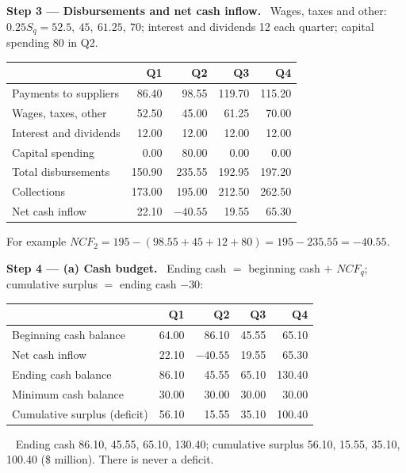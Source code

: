 \documentclass[11pt,a4paper]{article}
\newcommand{\step}[2]{\par\medskip\noindent\textbf{Step #1 --- #2.}~}
\newcommand{\answer}[1]{\par\smallskip\noindent\fbox{\textbf{Answer #1.}}~}
\begin{document}
\step{3}{Disbursements and net cash inflow}
Wages, taxes and other: $0.25 S_q = 52.5,\ 45,\ 61.25,\ 70$; interest and dividends 12 each
quarter; capital spending 80 in Q2.
\begin{center}
\begin{tabular}{lrrrr}
\toprule
 & Q1 & Q2 & Q3 & Q4\\
\midrule
Payments to suppliers & 86.40 & 98.55 & 119.70 & 115.20\\
Wages, taxes, other & 52.50 & 45.00 & 61.25 & 70.00\\
Interest and dividends & 12.00 & 12.00 & 12.00 & 12.00\\
Capital spending & 0.00 & 80.00 & 0.00 & 0.00\\
\midrule
Total disbursements & 150.90 & 235.55 & 192.95 & 197.20\\
Collections & 173.00 & 195.00 & 212.50 & 262.50\\
\midrule
Net cash inflow & 22.10 & $-40.55$ & 19.55 & 65.30\\
\bottomrule
\end{tabular}
\end{center}
For example $NCF_2 = 195 - (98.55 + 45 + 12 + 80) = 195 - 235.55 = -40.55$.

\step{4}{(a) Cash budget}
Ending cash $=$ beginning cash $+$ $NCF_q$; cumulative surplus $=$ ending cash $- 30$:
\begin{center}
\begin{tabular}{lrrrr}
\toprule
 & Q1 & Q2 & Q3 & Q4\\
\midrule
Beginning cash balance & 64.00 & 86.10 & 45.55 & 65.10\\
Net cash inflow & 22.10 & $-40.55$ & 19.55 & 65.30\\
Ending cash balance & 86.10 & 45.55 & 65.10 & 130.40\\
Minimum cash balance & 30.00 & 30.00 & 30.00 & 30.00\\
Cumulative surplus (deficit) & 56.10 & 15.55 & 35.10 & 100.40\\
\bottomrule
\end{tabular}
\end{center}

\answer{(a)} Ending cash 86.10, 45.55, 65.10, 130.40; cumulative surplus 56.10, 15.55, 35.10,
100.40 (\$ million). There is never a deficit.
\end{document}
